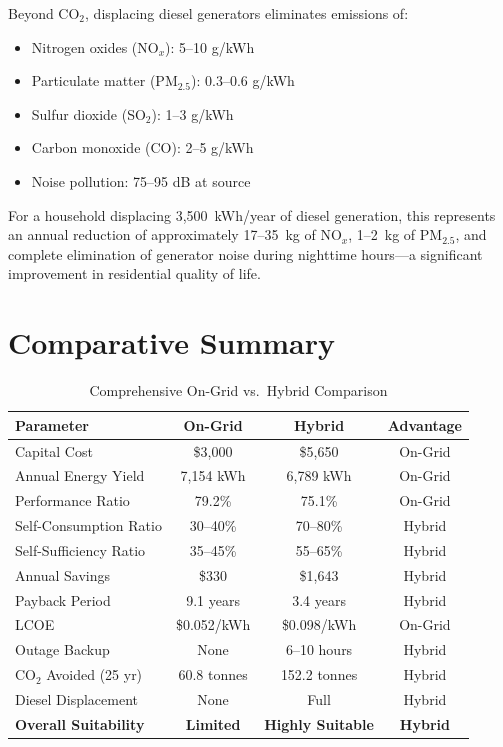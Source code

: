 Beyond CO$_2$, displacing diesel generators eliminates emissions of:
\begin{itemize}
    \item Nitrogen oxides (NO$_x$): 5--10 g/kWh
    \item Particulate matter (PM$_{2.5}$): 0.3--0.6 g/kWh
    \item Sulfur dioxide (SO$_2$): 1--3 g/kWh
    \item Carbon monoxide (CO): 2--5 g/kWh
    \item Noise pollution: 75--95 dB at source
\end{itemize}

For a household displacing 3,500~kWh/year of diesel generation, this represents an annual reduction of approximately 17--35~kg of NO$_x$, 1--2~kg of PM$_{2.5}$, and complete elimination of generator noise during nighttime hours---a significant improvement in residential quality of life.


\section{Comparative Summary}

\begin{table}[H]
\centering
\caption{Comprehensive On-Grid vs.\ Hybrid Comparison}
\label{tab:final_comparison}
\small
\begin{tabular}{@{}p{4.5cm} c c c@{}}
\toprule
\textbf{Parameter} & \textbf{On-Grid} & \textbf{Hybrid} & \textbf{Advantage} \\
\midrule
Capital Cost & \$3,000 & \$5,650 & On-Grid \\
Annual Energy Yield & 7,154 kWh & 6,789 kWh & On-Grid \\
Performance Ratio & 79.2\% & 75.1\% & On-Grid \\
Self-Consumption Ratio & 30--40\% & 70--80\% & Hybrid \\
Self-Sufficiency Ratio & 35--45\% & 55--65\% & Hybrid \\
Annual Savings & \$330 & \$1,643 & Hybrid \\
Payback Period & 9.1 years & 3.4 years & Hybrid \\
LCOE & \$0.052/kWh & \$0.098/kWh & On-Grid \\
Outage Backup & None & 6--10 hours & Hybrid \\
CO$_2$ Avoided (25 yr) & 60.8 tonnes & 152.2 tonnes & Hybrid \\
Diesel Displacement & None & Full & Hybrid \\
\textbf{Overall Suitability} & \textbf{Limited} & \textbf{Highly Suitable} & \textbf{Hybrid} \\
\bottomrule
\end{tabular}
\end{table}


